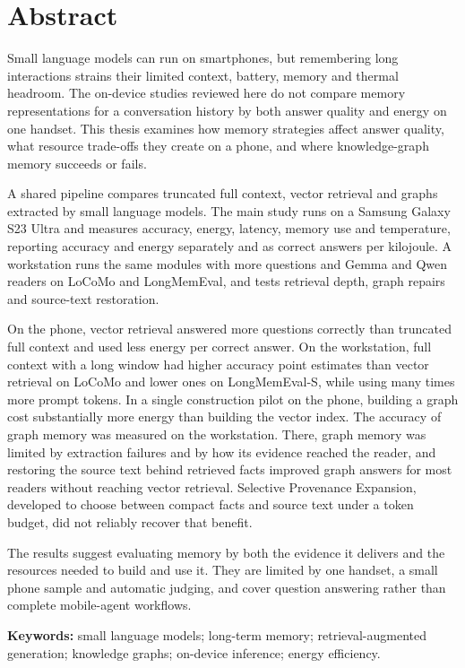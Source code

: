 
\chapter*{Abstract}

Small language models can run on smartphones, but remembering long interactions strains their
limited context, battery, memory and thermal headroom. The on-device studies reviewed here do not compare memory
representations for a conversation history by both answer quality and energy on one handset.
This thesis examines how memory strategies affect answer quality, what resource trade-offs
they create on a phone, and where knowledge-graph memory succeeds or fails.

A shared pipeline compares truncated full context, vector retrieval and graphs extracted by
small language models. The main study runs on a Samsung Galaxy S23 Ultra and measures accuracy,
energy, latency, memory use and temperature, reporting accuracy and energy separately and as
correct answers per kilojoule. A workstation runs the same modules with more questions and
Gemma and Qwen readers on LoCoMo and LongMemEval, and tests retrieval depth, graph repairs and
source-text restoration.

On the phone, vector retrieval answered more questions correctly than truncated full context
and used less energy per correct answer. On the workstation, full context with a long window had higher
accuracy point estimates than vector retrieval on LoCoMo and lower ones on LongMemEval-S, while
using many times more prompt tokens. In a single construction pilot on the phone, building
a graph cost substantially more energy than building the vector index. The accuracy of
graph memory was measured on the workstation. There, graph memory was limited by extraction
failures and by how its evidence reached the reader, and restoring the source text behind
retrieved facts improved graph answers for most readers without reaching vector retrieval.
Selective Provenance Expansion, developed to choose between compact facts and source text under
a token budget, did not reliably recover that benefit.

The results suggest evaluating memory by both the evidence it delivers and the resources needed
to build and use it. They are limited by one handset, a small phone sample and automatic
judging, and cover question answering rather than complete mobile-agent workflows.

\medskip
\noindent\textbf{Keywords:} small language models; long-term memory; retrieval-augmented
generation; knowledge graphs; on-device inference; energy efficiency.
